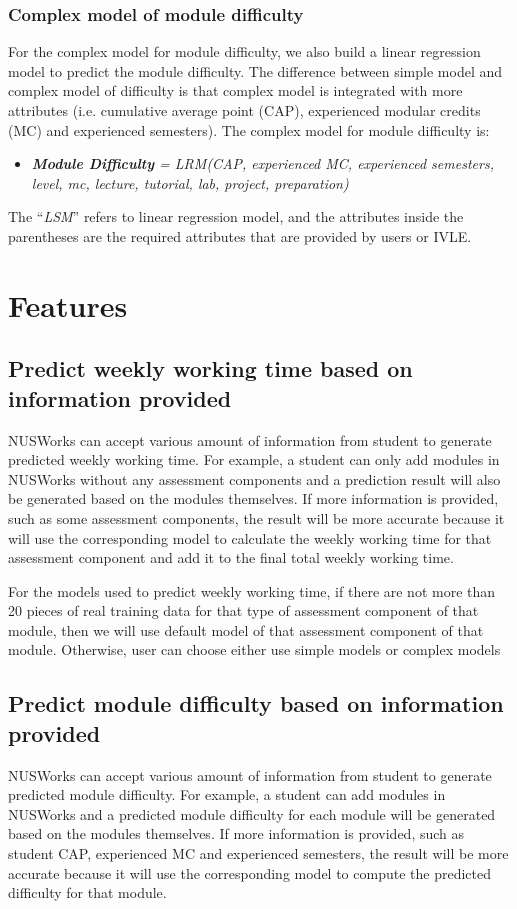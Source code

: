 \documentclass[fyp]{socreport}
\begin{document}
\subsubsection{Complex model of module difficulty}
For the complex model for module difficulty, we also build a linear regression model to predict the module difficulty. The difference between simple model and complex model of difficulty is that complex model is integrated with more attributes (i.e. cumulative average point (CAP), experienced modular credits (MC) and experienced semesters). The complex model for module difficulty is:
\begin{itemize}
	\item \textit{\textbf{Module Difficulty} = LRM(CAP, experienced MC, experienced semesters, level, mc, lecture, tutorial, lab, project, preparation)}
\end{itemize}

The “\textit{LSM}” refers to linear regression model, and the attributes inside the parentheses are the required attributes that are provided by users or IVLE.

\section{Features}
\subsection{Predict weekly working time based on information provided}
NUSWorks can accept various amount of information from student to generate predicted weekly working time. For example, a student can only add modules in NUSWorks without any assessment components and a prediction result will also be generated based on the modules themselves. If more information is provided, such as some assessment components, the result will be more accurate because it will use the corresponding model to calculate the weekly working time for that assessment component and add it to the final total weekly working time.

For the models used to predict weekly working time, if there are not more than 20 pieces of real training data for that type of assessment component of that module, then we will use default model of that assessment component of that module. Otherwise, user can choose either use simple models or complex models

\subsection{Predict module difficulty based on information provided}
NUSWorks can accept various amount of information from student to generate predicted module difficulty. For example, a student can add modules in NUSWorks and a predicted module difficulty for each module will be generated based on the modules themselves. If more information is provided, such as student CAP, experienced MC and experienced semesters, the result will be more accurate because it will use the corresponding model to compute the predicted difficulty for that module.
\end{document}
